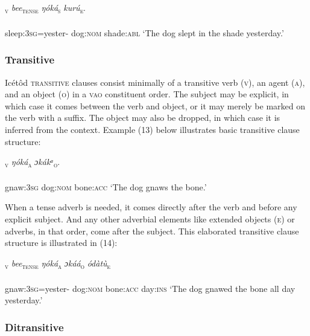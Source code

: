 \ea\label{ex:}
\textsc{\textsubscript{v}} \textit{bee}\textsc{\textsubscript{tense}}\textit{   ŋóká}\textsc{\textsubscript{s}}\textit{     kurú}\textsc{\textsubscript{e}}. \\
    \\
sleep:\textsc{3sg}=yester-   dog:\textsc{nom}   shade:\textsc{abl}
\glt ‘The dog slept in the shade yesterday.’ 
\z




\subsubsection{Transitive}

Icétôd \textsc{transitive} clauses consist minimally of a transitive verb (\textsc{v}), an agent (\textsc{a}), and an object (\textsc{o}) in a \textsc{vao} constituent order. The subject may be explicit, in which case it comes between the verb and object, or it may merely be marked on the verb with a suffix. The object may also be dropped, in which case it is inferred from the context. Example (13) below illustrates basic transitive clause structure:




\ea\label{ex:}
\textsc{\textsubscript{v}}    \textit{ŋóká}\textsc{\textsubscript{a}}\textit{    ɔkákᵃ}\textsc{\textsubscript{o}}\textsc{.} \\
    \\
gnaw:\textsc{3sg}  dog:\textsc{nom}  bone:\textsc{acc}
\glt ‘The dog gnaws the bone.’ 
\z


When a tense adverb is needed, it comes directly after the verb and before any explicit subject. And any other adverbial elements like extended objects (\textsc{e}) or adverbs, in that order, come after the subject. This elaborated transitive clause structure is illustrated in (14):



\ea\label{ex:}
\textsc{\textsubscript{v}}\textit{ bee}\textsc{\textsubscript{tense}}\textit{   ŋóká}\textsc{\textsubscript{a}}\textit{     ɔkáá}\textsc{\textsubscript{o}}\textit{         ódàtù}\textsc{\textsubscript{e}} \\
    \\
gnaw:\textsc{3sg}=yester-  dog:\textsc{nom}  bone:\textsc{acc}  day:\textsc{ins}
\glt ‘The dog gnawed the bone all day yesterday.’ 
\z




\subsubsection{Ditransitive}

